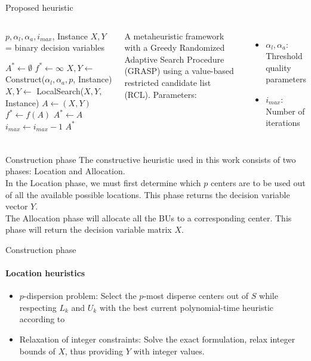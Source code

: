 \documentclass{beamer}
\begin{document}
\begin{frame}{Proposed heuristic}
    \begin{columns}
        \begin{algorithmic}[1]
        
        \REQUIRE $p, \alpha_l, \alpha_a, i_{max}$, Instance
        \ENSURE $X,Y$ = binary decision variables
        
        \STATE $A^* \gets \emptyset$
        \STATE $f^* \gets \infty$
            \STATE $X, Y \gets$ Construct($\alpha_l, \alpha_a, p$, Instance)
            \STATE $X, Y \gets$ LocalSearch($X, Y,$ Instance)
            \STATE $A \gets (X, Y)$
                \STATE $f^* \gets f(A)$
                \STATE $A^* \gets A$ 
            \ENDIF
            \STATE $i_{max} \gets i_{max} - 1$
        \ENDWHILE
        \RETURN $A^*$
        
        \end{algorithmic}
        
        A metaheuristic framework with a Greedy Randomized Adaptive Search Procedure (GRASP) using a value-based restricted candidate list (RCL).
        Parameters:
        \begin{itemize}
            \item $\alpha_l, \alpha_a$: Threshold quality parameters
            \item $i_{max}$: Number of iterations
        \end{itemize}
    \end{columns}
\end{frame}

\begin{frame}{Construction phase}
    The constructive heuristic used in this work consists of two phases: Location and Allocation. \\
    In the Location phase, we must first determine which $p$ centers are to be used out of all the available possible locations. This phase returns the decision variable vector $Y$. \\
    The Allocation phase will allocate all the BUs to a corresponding center. This phase will return the decision variable matrix $X$. \\
\end{frame}

\begin{frame}{Construction phase}
    \framesubtitle{Location heuristics}
    \begin{itemize}
        \item $p$-dispersion problem: Select the $p$-most disperse centers out of $S$ while respecting $L_k$ and $U_k$ with the best current polynomial-time heuristic according to \cite{ravi_heuristic_1994}
        \item Relaxation of integer constraints: Solve the exact formulation, relax integer bounds of $X$, thus providing $Y$ with integer values.
    \end{itemize}
\end{frame}
\end{document}
